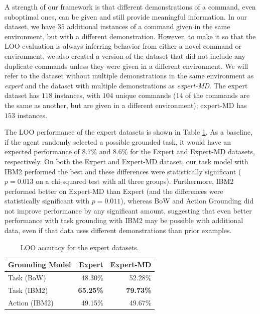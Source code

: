 \documentclass[conference]{IEEEtran}
\begin{document}
A strength of our framework is that different demonstrations of a command, even suboptimal ones, can be given and still provide meaningful information. In our dataset, we have $35$ additional instances of a command given in the same environment, but with a different demonstration. However, to make it so that the LOO evaluation is always inferring behavior from either a novel command or environment, we also created a version of the dataset that did not include any duplicate commands unless they were given in a different environment. We will refer to the dataset without multiple demonstrations in the same environment as {\em expert} and the dataset with multiple demonstrations as {\em expert-MD}. The expert dataset has $118$ instances, with $104$ unique commands ($14$ of the commands are the same as another, but are given in a different environment); expert-MD has $153$ instances. %

The LOO performance of the expert datasets is shown in Table \ref{tab:res_e}. As a baseline, if the agent randomly selected a possible grounded task, it would have an expected performance of $8.7\%$ and $8.6\%$ for the Expert and Expert-MD datasets, respectively. On both the Expert and Expert-MD dataset, our task model with IBM2 performed the best and these differences were statistically significant ($p = 0.013$ on a chi-squared test with all three groups). Furthermore, IBM2 performed better on Expert-MD than Expert (and the differences were statistically significant with $p = 0.011$), whereas BoW and Action Grounding did not improve performance by any significant amount, suggesting that even better performance with task grounding with IBM2 may be possible with additional data, even if that data uses different demonstrations than prior examples. 


\begin{table}[tb]
\begin{center}
\begin{tabular}{@{}lrr@{}} \toprule
Grounding Model & Expert & Expert-MD \\ \midrule
Task (BoW) & 48.30\% & 52.28\% \\ 
Task (IBM2) & {\bf 65.25\%} & {\bf 79.73\%}  \\ 
Action (IBM2) & 49.15\% & 49.67\% \\ \bottomrule
\hline
 \end{tabular} 
 \caption{LOO accuracy for the expert datasets.}
 \label{tab:res_e}
\end{center}
\end{table}
\end{document}
